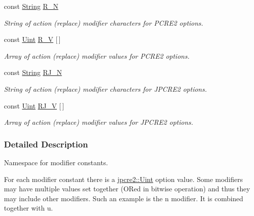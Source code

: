 \begin{DoxyCompactItemize}
\hypertarget{namespacejpcre2_1_1MOD_a122c288202e5ffc105b93fac5a7335bf}{}\label{namespacejpcre2_1_1MOD_a122c288202e5ffc105b93fac5a7335bf} 
const \hyperlink{namespacejpcre2_a91f03070152fb228bc116c5a737f1d16}{String} \hyperlink{namespacejpcre2_1_1MOD_a122c288202e5ffc105b93fac5a7335bf}{R\+\_\+N}
\begin{DoxyCompactList}\small\item\em String of action (replace) modifier characters for P\+C\+R\+E2 options. \end{DoxyCompactList}\item 
\hypertarget{namespacejpcre2_1_1MOD_adde7332e9b90d54c907c30dfa9fbc4d6}{}\label{namespacejpcre2_1_1MOD_adde7332e9b90d54c907c30dfa9fbc4d6} 
const \hyperlink{namespacejpcre2_a078242d38221a13fb3543b9edd78c099}{Uint} \hyperlink{namespacejpcre2_1_1MOD_adde7332e9b90d54c907c30dfa9fbc4d6}{R\+\_\+V} \mbox{[}$\,$\mbox{]}
\begin{DoxyCompactList}\small\item\em Array of action (replace) modifier values for P\+C\+R\+E2 options. \end{DoxyCompactList}\item 
\hypertarget{namespacejpcre2_1_1MOD_a8d13695c0e0355460cef4f7b96076210}{}\label{namespacejpcre2_1_1MOD_a8d13695c0e0355460cef4f7b96076210} 
const \hyperlink{namespacejpcre2_a91f03070152fb228bc116c5a737f1d16}{String} \hyperlink{namespacejpcre2_1_1MOD_a8d13695c0e0355460cef4f7b96076210}{R\+J\+\_\+N}
\begin{DoxyCompactList}\small\item\em String of action (replace) modifier characters for J\+P\+C\+R\+E2 options. \end{DoxyCompactList}\item 
\hypertarget{namespacejpcre2_1_1MOD_a30011385a69e77d8681517c621c2a140}{}\label{namespacejpcre2_1_1MOD_a30011385a69e77d8681517c621c2a140} 
const \hyperlink{namespacejpcre2_a078242d38221a13fb3543b9edd78c099}{Uint} \hyperlink{namespacejpcre2_1_1MOD_a30011385a69e77d8681517c621c2a140}{R\+J\+\_\+V} \mbox{[}$\,$\mbox{]}
\begin{DoxyCompactList}\small\item\em Array of action (replace) modifier values for J\+P\+C\+R\+E2 options. \end{DoxyCompactList}\end{DoxyCompactItemize}


\subsubsection{Detailed Description}
Namespace for modifier constants. 

For each modifier constant there is a \hyperlink{namespacejpcre2_a078242d38221a13fb3543b9edd78c099}{jpcre2\+::\+Uint} option value. Some modifiers may have multiple values set together (O\+Red in bitwise operation) and thus they may include other modifiers. Such an example is the \textquotesingle{}n\textquotesingle{} modifier. It is combined together with \textquotesingle{}u\textquotesingle{}. 